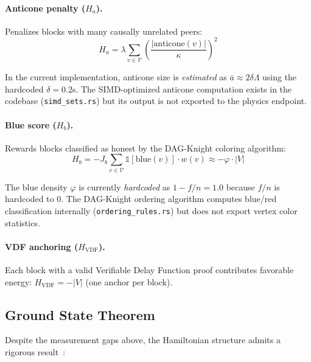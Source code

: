 \documentclass[11pt,a4paper,twocolumn]{article}
\begin{document}
\paragraph{Anticone penalty ($H_a$).} Penalizes blocks with many causally unrelated peers:
\begin{equation}
H_a = \lambda \sum_{v \in \mathcal{V}} \left(\frac{|\text{anticone}(v)|}{\kappa}\right)^2
\end{equation}

\begin{honestybox}
In the current implementation, anticone size is \emph{estimated} as $\bar{a} \approx 2\delta\Lambda$ using the hardcoded $\delta = 0.2$s. The SIMD-optimized anticone computation exists in the codebase (\texttt{simd\_sets.rs}) but its output is not exported to the physics endpoint.
\end{honestybox}

\paragraph{Blue score ($H_b$).} Rewards blocks classified as honest by the DAG-Knight coloring algorithm:
\begin{equation}
H_b = -J_b \sum_{v \in \mathcal{V}} \mathbb{1}[\text{blue}(v)] \cdot w(v) \approx -\varphi \cdot |V|
\end{equation}

\begin{honestybox}
The blue density $\varphi$ is currently \emph{hardcoded} as $1 - f/n = 1.0$ because $f/n$ is hardcoded to 0. The DAG-Knight ordering algorithm computes blue/red classification internally (\texttt{ordering\_rules.rs}) but does not export vertex color statistics.
\end{honestybox}

\paragraph{VDF anchoring ($H_{\text{VDF}}$).} Each block with a valid Verifiable Delay Function proof contributes favorable energy: $H_{\text{VDF}} = -|V|$ (one anchor per block).

\subsection{Ground State Theorem}

Despite the measurement gaps above, the Hamiltonian structure admits a rigorous result~\cite{qnk-node-system}:
\end{document}
